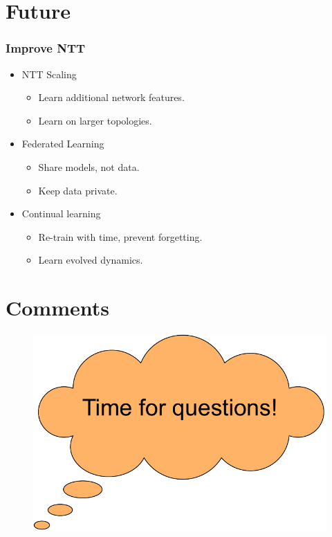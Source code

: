 \documentclass{beamer}
\begin{document}

\section{Future}

\begin{frame}
\frametitle{Improve NTT}
\pause
\begin{itemize}
    \item<1-> NTT Scaling
    \begin{itemize}
    	\item<1-> Learn additional network features.
	\item<1-> Learn on larger topologies.
    \end{itemize}
    \pause
    \item<2-> Federated Learning
    \begin{itemize}
    	\item<2-> Share models, not data.
	\item<2->Keep data private.
	\end{itemize}
    \pause
    \item<3-> Continual learning
    \begin{itemize}
    	\item<3->  Re-train with time, prevent forgetting.
	\item<3->  Learn evolved dynamics.
	\end{itemize}
\end{itemize}
\end{frame}

\section{Comments}
\begin{frame}

\begin{figure}[h]
  \begin{center}
    \includegraphics[scale=0.55]{figures/questions.pdf}
    \label{fig:questions}
  \end{center}
\end{figure}


\end{frame}
\end{document}
